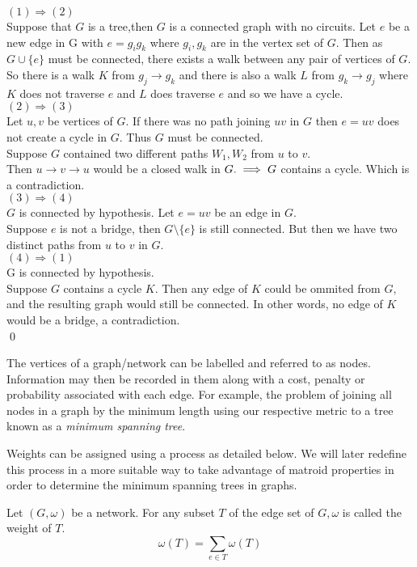 \documentclass[../main.tex]{subfiles}
\begin{document}
 \noindent\Proof $(1) \Longrightarrow (2)$\\
 \noindent Suppose that $G$ is a tree,then $G$ is a connected graph with no circuits. Let $e$ be a new edge in G with $e = g_ig_k$ where $g_i,g_k$ are in the vertex set of $G.$ Then as $G \cup \{e\}$ must be connected, there exists a walk between any pair of vertices of $G$. So there is a walk $K$ from $g_j \rightarrow g_k$ and there is also a walk $L$ from $g_k \rightarrow g_j$ where $K$ does not traverse $e$ and $L$ does traverse $e$ and so we have a cycle.\\

\noindent\Proof $(2) \Longrightarrow (3)$\\
\noindent Let $u,v$ be vertices of $G.$ If there was no path joining $uv$ in $G$ then $e = uv$ does not create a cycle in $G.$ Thus $G$ must be connected.\\
\noindent Suppose $G$ contained two different paths $W_1, W_2$ from $u$ to $v.$\\
\noindent Then $ u \longrightarrow v \longrightarrow u$ would be a closed walk in $G. \\ \implies G$ contains a cycle. Which is a contradiction.\\

\noindent\Proof $(3) \Longrightarrow (4)$\\
\noindent $G$ is connected by hypothesis. Let $e = uv$ be an edge in $G.$\\
\noindent Suppose $e$ is not a bridge, then $G \setminus \{e\}$ is still connected. But then we have two distinct paths from $u$ to $v$ in $G.$\\

\noindent\Proof $(4) \Longrightarrow (1)$\\
\noindent G is connected by hypothesis.\\
\noindent Suppose $G$ contains a cycle $K.$ Then any edge of $K$ could be ommited from $G,$ and the resulting graph would still be connected. In other words, no edge of $K$ would be a bridge, a contradiction.\\
\qed

\noindent The vertices of a graph/network can be labelled and referred to as nodes. Information may then be recorded in them along with a cost, penalty or probability associated with each edge. For example, the problem of joining all nodes in a graph by the minimum length using our respective metric to a tree known as a \textit{minimum spanning tree}.

\noindent Weights can be assigned using a process as detailed below. We will later redefine this process in a more suitable way to take advantage of matroid properties in order to determine the minimum spanning trees in graphs.
\begin{defn}
Let $(G,\omega)$ be a network. For any subset $T$ of the edge set of $G, \omega$ is called the weight of $T.$\\
\begin{equation}
\omega (T) = \displaystyle\sum_{e \in T} \omega (T)
\end{equation}
\end{defn}
\end{document}

